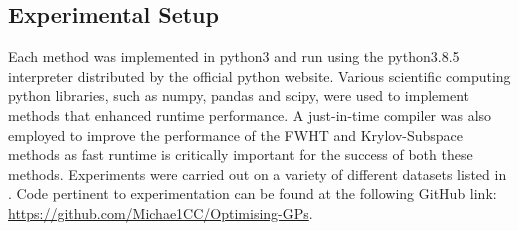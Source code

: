 \subsection{Experimental Setup}\label{Section5.2}

Each method was implemented in python3 and run using the python3.8.5 interpreter distributed by the official python website. Various scientific computing python libraries, such as numpy, pandas and scipy, were used to implement methods that enhanced runtime performance. A just-in-time compiler was also employed to improve the performance of the FWHT and Krylov-Subspace methods as fast runtime is critically important for the success of both these methods. Experiments were carried out on a variety of different datasets listed in . Code pertinent to experimentation can be found at the following GitHub link: \href{https://github.com/Michae1CC/Optimising-GPs}{https://github.com/Michae1CC/Optimising-GPs}.

